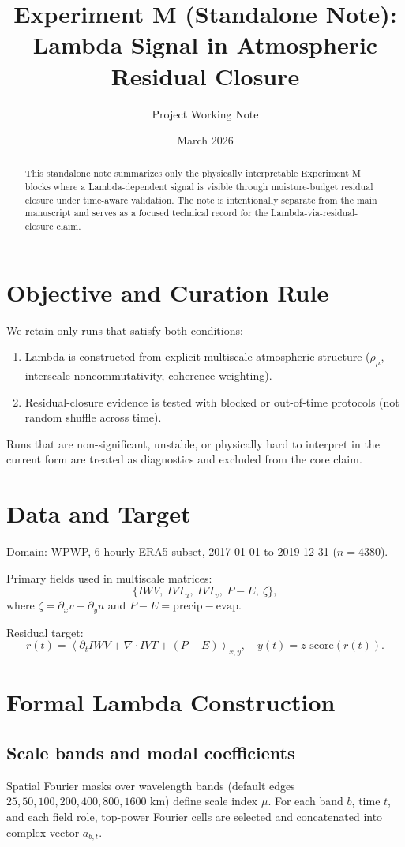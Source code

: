 \documentclass[11pt]{article}
\title{Experiment M (Standalone Note):\\Lambda Signal in Atmospheric Residual Closure}
\author{Project Working Note}
\date{March 2026}
\begin{document}
\maketitle

\begin{abstract}
This standalone note summarizes only the physically interpretable Experiment M blocks where a Lambda-dependent signal is visible through moisture-budget residual closure under time-aware validation. The note is intentionally separate from the main manuscript and serves as a focused technical record for the Lambda-via-residual-closure claim.
\end{abstract}

\section{Objective and Curation Rule}
We retain only runs that satisfy both conditions:
\begin{enumerate}
  \item Lambda is constructed from explicit multiscale atmospheric structure (\(\rho_\mu\), interscale noncommutativity, coherence weighting).
  \item Residual-closure evidence is tested with blocked or out-of-time protocols (not random shuffle across time).
\end{enumerate}

Runs that are non-significant, unstable, or physically hard to interpret in the current form are treated as diagnostics and excluded from the core claim.

\section{Data and Target}
Domain: WPWP, 6-hourly ERA5 subset, 2017-01-01 to 2019-12-31 (\(n=4380\)).

Primary fields used in multiscale matrices:
\[
\{IWV,\ IVT_u,\ IVT_v,\ P-E,\ \zeta\},
\]
where \(\zeta = \partial_x v - \partial_y u\) and \(P-E=\mathrm{precip}-\mathrm{evap}\).

Residual target:
\[
r(t)=\left\langle \partial_t IWV + \nabla\cdot IVT + (P-E)\right\rangle_{x,y},
\quad
y(t)=z\text{-score}(r(t)).
\]

\section{Formal Lambda Construction}
\subsection{Scale bands and modal coefficients}
Spatial Fourier masks over wavelength bands (default edges \(25,50,100,200,400,800,1600\) km) define scale index \(\mu\). For each band \(b\), time \(t\), and each field role, top-power Fourier cells are selected and concatenated into complex vector \(a_{b,t}\).
\end{document}
